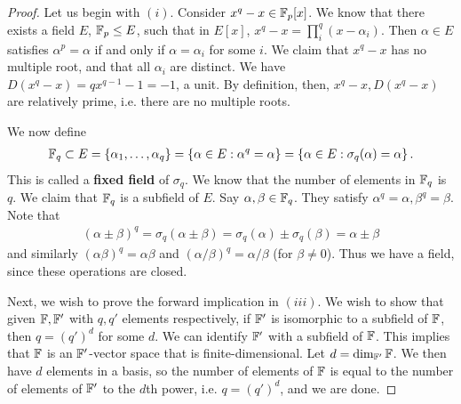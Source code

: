 \documentclass{../mathnotes}
\begin{document}
\begin{proof}
    Let us begin with $(i)$. Consider $x^q-x\in\mathbb{F}_p[x]$. We know that there exists a field $E$, $\mathbb{F}_p\leq E$, such that in $E[x]$,
    $x^q-x=\prod_i^q(x-\alpha_i)$. Then $\alpha\in E$ satisfies $\alpha^p=\alpha$ if and only if $\alpha=\alpha_i$ for some $i$.
    We claim that $x^q-x$ has no multiple root, and that all $\alpha_i$ are distinct. We have $D(x^q-x)=qx^{q-1}-1=-1$, a unit.
    By definition, then, $x^q-x,D(x^q-x)$ are relatively prime, i.e. there are no multiple roots.

    We now define 
    \begin{align*}
        \mathbb{F}_q\subset E=\left\{ \alpha_1,\ldots,\alpha_q \right\}=\left\{ \alpha\in E:\alpha^q=\alpha \right\}=\left\{ \alpha\in E:\sigma_q(\alpha)=\alpha \right\}.
    \end{align*}
    This is called a \textbf{fixed field} of $\sigma_q$. We know that the number of elements in $\mathbb{F}_q$ is $q$. We claim that $\mathbb{F}_q$ is a subfield
    of $E$. Say $\alpha,\beta\in \mathbb{F}_q$. They satisfy $\alpha^q=\alpha,\beta^q=\beta$. Note that
    \begin{align*}
        (\alpha\pm\beta)^q=\sigma_q(\alpha\pm\beta)=\sigma_q(\alpha)\pm\sigma_q(\beta)=\alpha\pm\beta
    \end{align*}
    and similarly $(\alpha\beta)^q=\alpha\beta$ and $(\alpha/\beta)^q=\alpha/\beta$ (for $\beta\neq 0$). Thus we have a field, since these operations are closed.

    Next, we wish to prove the forward implication in $(iii)$. We wish to show that given $\mathbb{F},\mathbb{F}'$ with $q,q'$ elements respectively,
    if $\mathbb{F}'$ is isomorphic to a subfield of $\mathbb{F}$, then $q=(q')^d$ for some $d$. We can identify $\mathbb{F}'$ with a subfield of $\mathbb{F}$. This implies
    that $\mathbb{F}$ is an $\mathbb{F}'$-vector space that is finite-dimensional. Let $d=\dim_{\mathbb{F}'}\mathbb{F}$. We then have $d$ elements in a basis, so the number of elements of
    $\mathbb{F}$ is equal to the number of elements of $\mathbb{F}'$ to the $d$th power, i.e. $q=(q')^d$, and we are done.


\end{proof}
\end{document}
